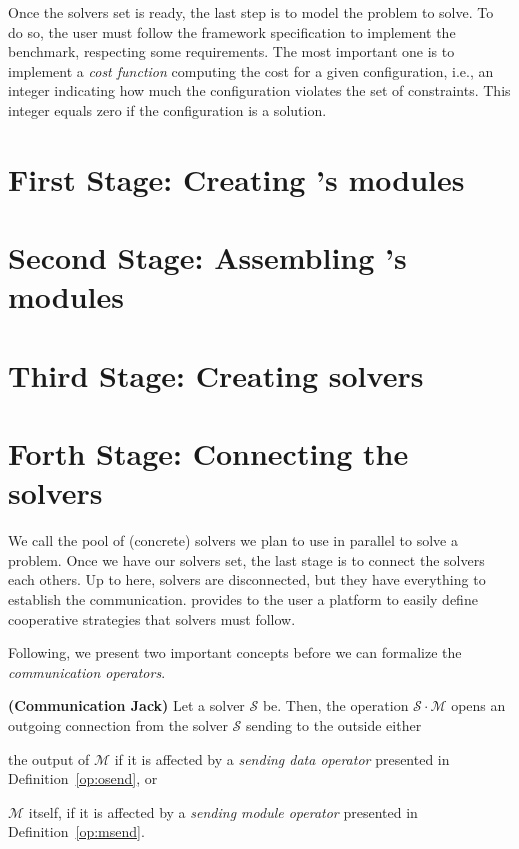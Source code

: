 Once the solvers set is ready, the last step is to model the problem to solve. To do so, the user must follow the framework specification to implement the benchmark, respecting some requirements. The most important one is to implement a {\it cost function} computing the cost for a given configuration, i.e., an integer indicating how much the configuration violates the set of constraints. This integer equals zero if the configuration is a solution.

\section{First Stage: Creating \posl's modules}
\label{sec:1ststage}



\section{Second Stage: Assembling \posl's modules}
\label{sec:2ndstage}



\section{Third Stage: Creating \posl{} solvers}
\label{sec:3rdstage}



\section{Forth Stage: Connecting the solvers}
\label{sec:4thstage}

We call \soset{} the pool of (concrete) solvers we plan to use in parallel to solve a problem. Once we have our solvers set, the last stage is to connect the solvers each others. Up to here, solvers are disconnected, but they have everything to establish the communication. \posl{} provides to the user a platform to easily define cooperative strategies that solvers must follow.

Following, we present two important concepts before we can formalize the {\it communication operators}.

\begin{definition}\label{def:comm_jack}
{\bf (Communication Jack)} Let a solver $\mathcal{S}$ be. Then, the operation $\mathcal{S}\cdot\mathcal{M}$ opens an outgoing connection from the solver $\mathcal{S}$ sending to the outside either 
\begin{inparaenum}[a)]
	\item the output of $\mathcal{M}$ if it is affected by a {\it sending data operator} presented in Definition~\ref{op:osend}, or
	\item $\mathcal{M}$ itself, if it is affected by a {\it sending module operator} presented in Definition~\ref{op:msend}.
\end{inparaenum}
\end{definition} 

